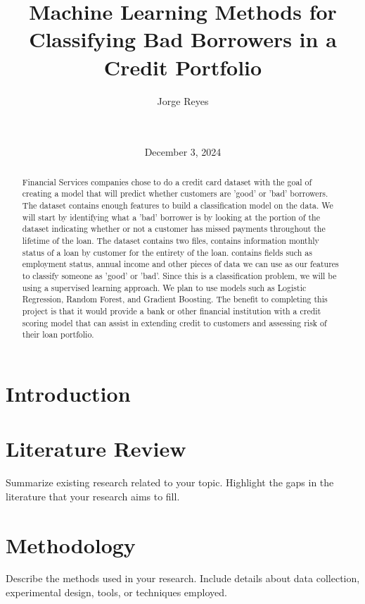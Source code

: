 \documentclass[12pt,a4paper]{article}
\title{Machine Learning Methods for Classifying Bad Borrowers in a Credit Portfolio \\[0.5cm]}
\author{Jorge Reyes \\[0.25cm] \text{University of Tennessee, Knoxville} \\[0.25cm] \text{COSC 522 Machine Learning} \\[0.25cm]}
\date{December 3, 2024}
\begin{document}
\maketitle
\clearpage %

\tableofcontents
\newpage

\section{Introduction}

\begin{abstract}
    Financial Services companies  chose to do a credit card dataset with the goal of 
    creating a model that will predict whether customers are 
    'good' or 'bad' borrowers. The dataset contains enough features 
    to build a classification model on the data. We will start by 
    identifying what a 'bad' borrower is by looking at the 
    portion of the dataset indicating whether or not a customer has missed 
    payments throughout the lifetime of the loan. The dataset contains two files, 
    contains information 
    monthly status of a loan by customer for the entirety of the loan. 
    contains fields such as employment status, annual income 
    and other pieces of data we can use as our features to classify someone as 
    'good' or 'bad'. Since this is a classification problem, we will be using a 
    supervised learning approach. We plan to use models such as Logistic Regression, 
    Random Forest, and Gradient Boosting. The benefit to completing this project is that 
    it would provide a bank or other financial institution with a credit scoring model 
    that can assist in extending credit to customers and assessing risk of their loan 
    portfolio.
\end{abstract}
\newpage

\section{Literature Review}
Summarize existing research related to your topic. Highlight the gaps in the literature that your research aims to fill.

\section{Methodology}
Describe the methods used in your research. Include details about data collection, experimental design, tools, or techniques employed.
\end{document}
